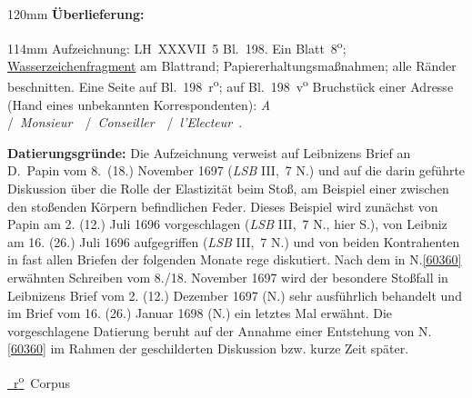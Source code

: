 \begin{ledgroupsized}[r]{120mm}
\footnotesize
\pstart
\noindent\textbf{Überlieferung:}
\pend
\end{ledgroupsized}
\begin{ledgroupsized}[r]{114mm}
\footnotesize
\pstart \parindent -6mm
%
Aufzeichnung:
LH~XXXVII~5 Bl.~198. 
Ein Blatt~8\textsuperscript{o};
\href{\Scan{LH_37_05_198wz}}%
{Wasserzeichenfragment}
am Blattrand;
Papiererhaltungsmaßnahmen;
alle Ränder beschnitten.
Eine Seite auf Bl.~198~r\textsuperscript{o}; 
auf Bl.~198~v\textsuperscript{o} Bruchstück einer Adresse (Hand eines unbekannten Korrespondenten): 
\textit{A} \lbrack/\rbrack\ 
\textit{Monsi}\textlangle\textit{eur}\textrangle\ 
\textlangle\textendash\textrangle\ \lbrack/\rbrack\ 
\textit{Conseille}\textlangle\textit{r}\textrangle\ \textlangle\textendash\textrangle\  \lbrack/\rbrack\ 
\textit{l'Elec}\textlangle\textit{teur}\textrangle\ \textlangle\textendash\textrangle.
\pend
\end{ledgroupsized}
\vspace{5mm}
\begin{ledgroup}
\footnotesize
\pstart
\noindent%
\textbf{Datierungsgründe:}
Die Aufzeichnung verweist auf Leibnizens 
\cite{01502}Brief an D.~Papin vom 8.\ (18.) November 1697 (\textit{LSB} III,~7 N.)
und auf die darin geführte Diskussion über die Rolle der Elastizität beim Stoß, am Beispiel einer zwischen den stoßenden Körpern befindlichen Feder.
Dieses Beispiel wird zunächst von Papin 
am 2. (12.) Juli 1696
vorgeschlagen
(\cite{02070}\textit{LSB} III,~7 N.\;2, hier S.\;20),
von Leibniz  am 16. (26.) Juli 1696 aufgegriffen (\cite{02071}\textit{LSB} III,~7 N.)
und von beiden Kontrahenten in fast allen Briefen der folgenden Monate rege diskutiert. 
Nach dem in N.\;\ref{60360} erwähnten Schreiben vom 8./18. November 1697
wird der besondere Stoßfall in Leibnizens Brief vom 2. (12.) Dezember 1697 (\cite{02072}N.) sehr ausführlich behandelt und im Brief vom 16. (26.) Januar 1698 (\cite{02073}N.) ein letztes Mal erwähnt.
Die vorgeschlagene Datierung beruht auf der Annahme einer Entstehung von N.\;\ref{60360} im Rahmen der geschilderten Diskussion bzw. kurze Zeit später.
\pend
\end{ledgroup}
\selectlanguage{latin}
\vspace{8mm}
\pstart%
\normalsize%
\noindent%
\href{\Scan{LH_37_05_198r}}%
{~r\textsuperscript{o}\rbrack}\
Corpus
